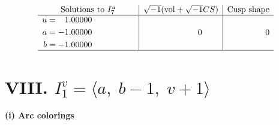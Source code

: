 \documentclass[1p]{elsarticle_modified}
\theoremstyle{definition}
\newcommand{\I}{\sqrt{-1}}
\begin{document}
$$\begin{array}{c|c|c}  
\text{Solutions to }I^u_{7}& \I (\text{vol} + \sqrt{-1}CS) & \text{Cusp shape}\\
 \hline 
\begin{aligned}
u &= \phantom{-}1.00000\phantom{ +0.000000I} \\
a &= -1.00000\phantom{ +0.000000I} \\
b &= -1.00000\phantom{ +0.000000I}\end{aligned}
 & \phantom{-0.000000 } 0 & \phantom{-0.000000 } 0\\
 \hline 
 \end{array}$$\newpage\newpage\renewcommand{\arraystretch}{1}
\centering \section*{VIII. $I^v_{1}= \langle a,\;b-1,\;v+1 \rangle$}
\flushleft \textbf{(i) Arc colorings}\\
\end{document}
